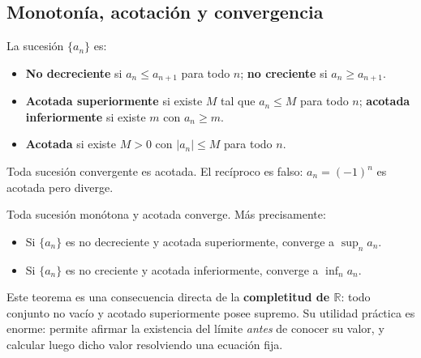 \subsection{Monotonía, acotación y convergencia}

\begin{definition}
La sucesión $\{a_n\}$ es:
\begin{itemize}
  \item \textbf{No decreciente} si $a_n \leq a_{n+1}$ para todo $n$;
        \textbf{no creciente} si $a_n \geq a_{n+1}$.
  \item \textbf{Acotada superiormente} si existe $M$ tal que $a_n \leq M$
        para todo $n$; \textbf{acotada inferiormente} si existe $m$ con
        $a_n \geq m$.
  \item \textbf{Acotada} si existe $M > 0$ con $|a_n| \leq M$ para todo $n$.
\end{itemize}
\end{definition}

\begin{rem}
Toda sucesión convergente es acotada. El recíproco es falso: $a_n = (-1)^n$ es acotada pero diverge.
\end{rem}

\begin{theorem}
\label{thm:mono}
Toda sucesión monótona y acotada converge. Más precisamente:
\begin{itemize}
  \item Si $\{a_n\}$ es no decreciente y acotada superiormente, converge a
        $\sup_n a_n$.
  \item Si $\{a_n\}$ es no creciente y acotada inferiormente, converge a
        $\inf_n a_n$.
\end{itemize}
\end{theorem}

\begin{rem}
Este teorema es una consecuencia directa de la \textbf{completitud de
$\mathbb{R}$}: todo conjunto no vacío y acotado superiormente posee supremo.
Su utilidad práctica es enorme: permite afirmar la existencia del límite
\emph{antes} de conocer su valor, y calcular luego dicho valor resolviendo
una ecuación fija.
\end{rem}

